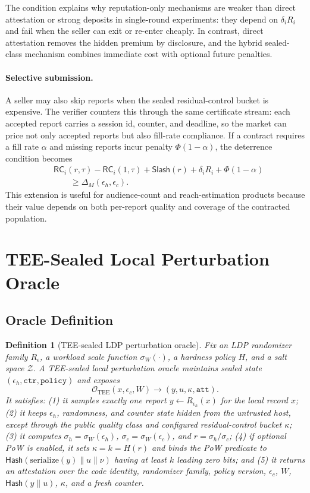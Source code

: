 \documentclass[conference]{IEEEtran}
\newtheorem{definition}{Definition}[section]
\newcommand{\eps}{\epsilon}
\newcommand{\TEE}{\mathrm{TEE}}
\begin{document}
The condition explains why reputation-only mechanisms are weaker than direct attestation or strong deposits in single-round experiments: they depend on $\delta_iR_i$ and fail when the seller can exit or re-enter cheaply. In contrast, direct attestation removes the hidden premium by disclosure, and the hybrid sealed-class mechanism combines immediate cost with optional future penalties.


\paragraph{Selective submission.}
A seller may also skip reports when the sealed residual-control bucket is expensive. The verifier counters this through the same certificate stream: each accepted report carries a session id, counter, and deadline, so the market can price not only accepted reports but also fill-rate compliance. If a contract requires a fill rate $\alpha$ and missing reports incur penalty $\Phi(1-\alpha)$, the deterrence condition becomes
\[
\begin{aligned}
&\mathsf{RC}_i(r,\tau)-\mathsf{RC}_i(1,\tau)+\mathsf{Slash}(r)
  +\delta_iR_i+\Phi(1-\alpha)\\
&\qquad \ge \Delta_M(\eps_h,\eps_c).
\end{aligned}
\]
This extension is useful for audience-count and reach-estimation products because their value depends on both per-report quality and coverage of the contracted population.

\section{TEE-Sealed Local Perturbation Oracle}
\label{sec:oracle}

\subsection{Oracle Definition}

\begin{definition}[TEE-sealed LDP perturbation oracle]
Fix an LDP randomizer family $R_\eps$, a workload scale function $\sigma_W(\cdot)$, a hardness policy $H$, and a salt space $\mathcal{Z}$. A TEE-sealed local perturbation oracle maintains sealed state $(\eps_h,\texttt{ctr},\texttt{policy})$ and exposes
\[
\mathcal{O}_{\TEE}(x,\eps_c,W)\rightarrow (y,u,\kappa,\texttt{att}).
\]
It satisfies: (1) it samples exactly one report $y\leftarrow R_{\eps_h}(x)$ for the local record $x$; (2) it keeps $\eps_h$, randomness, and counter state hidden from the untrusted host, except through the public quality class and configured residual-control bucket $\kappa$; (3) it computes $\sigma_h=\sigma_W(\eps_h)$, $\sigma_c=\sigma_W(\eps_c)$, and $r=\sigma_h/\sigma_c$; (4) if optional PoW is enabled, it sets $\kappa=k=H(r)$ and binds the PoW predicate to $\mathsf{Hash}(\mathrm{serialize}(y)\|u\|\nu)$ having at least $k$ leading zero bits; and (5) it returns an attestation over the code identity, randomizer family, policy version, $\eps_c$, $W$, $\mathsf{Hash}(y\|u)$, $\kappa$, and a fresh counter.
\end{definition}
\end{document}
